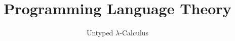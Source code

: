 \title{Programming Language Theory}
\subtitle{Untyped $\lambda$-Calculus}


{
\begin{frame}\maketitle\end{frame}}

